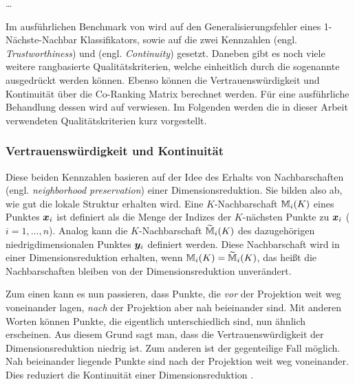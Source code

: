\ldots
{}

Im ausführlichen Benchmark von \textcite{vanderMaaten.2009} wird auf den Generalisierungsfehler
eines 1-Nächste-Nachbar Klassifikators, sowie auf die zwei Kennzahlen
 (engl. \textit{Trustworthiness}) und  (engl.
\textit{Continuity}) \parencites{Venna.2001}{Venna.2006} gesetzt. Daneben gibt es noch viele weitere rangbasierte
Qualitätskriterien, welche einheitlich durch die sogenannte  ausgedrückt
werden können. Ebenso können die Vertrauenswürdigkeit und Kontinuität über die Co-Ranking Matrix
berechnet werden. Für eine ausführliche Behandlung dessen wird auf \textcite{Lee.2009} verwiesen.
Im Folgenden werden die in dieser Arbeit verwendeten Qualitätskriterien kurz vorgestellt.

\subsubsection{Vertrauenswürdigkeit und Kontinuität}
Diese beiden Kennzahlen basieren auf der Idee des Erhalts von Nachbarschaften (engl.
\textit{neighborhood preservation}) einer Dimensionsreduktion. Sie bilden also ab, wie gut die
lokale Struktur erhalten wird. Eine $K$-Nachbarschaft $\mathbb{M}_i(K)$ eines Punktes $\bm{x}_i$ ist
definiert als die Menge der Indizes der $K$-nächsten
Punkte zu $\bm{x}_i$ ($i = 1, \ldots, n$). Analog kann die $K$-Nachbarschaft
$\widetilde{\mathbb{M}}_i(K)$ des dazugehörigen niedrigdimensionalen Punktes $\bm{y}_i$ definiert
werden. Diese Nachbarschaft wird in einer Dimensionsreduktion erhalten, wenn $\mathbb{M}_i(K) =
	\widetilde{\mathbb{M}}_i(K)$, das heißt die Nachbarschaften bleiben von der Dimensionsreduktion
unverändert.

Zum einen kann es nun passieren, dass Punkte, die \textit{vor} der Projektion weit weg voneinander
lagen, \textit{nach} der Projektion aber nah beieinander sind. Mit anderen Worten können Punkte,
die eigentlich unterschiedlich sind, nun ähnlich erscheinen. Aus diesem Grund sagt man, dass die
Vertrauenswürdigkeit der Dimensionsreduktion niedrig ist. Zum anderen ist der gegenteilige Fall
möglich. Nah beieinander liegende Punkte sind nach der Projektion weit weg voneinander. Dies
reduziert die Kontinuität einer Dimensionsreduktion \parencite[486 -- 487]{Venna.2001}.

